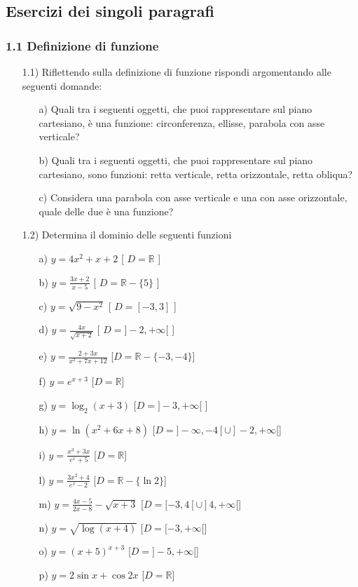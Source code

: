   \subsection{Esercizi dei singoli paragrafi}
  \subsubsection*{1.1 Definizione di funzione}
  \begin{itemize}
  \item[1.1)] Riflettendo sulla definizione di 
funzione rispondi argomentando alle seguenti domande:
  \begin{itemize}
  \item[a)] Quali tra i 
seguenti oggetti, che puoi rappresentare sul piano cartesiano, è una 
funzione: circonferenza, ellisse, parabola con asse verticale?
  \item[b)] Quali tra i 
seguenti oggetti, che puoi rappresentare sul piano cartesiano, sono funzioni: 
retta verticale, retta orizzontale, retta obliqua?
  \item[c)] Considera una 
parabola con asse verticale e una con asse orizzontale, quale delle due è una 
funzione?
  \end{itemize}
  \item[1.2)] Determina il dominio delle 
seguenti funzioni
  \begin{itemize}
  \item[a)] \(y= 4x^2+x+2\)   
   \hfill  [ \(D=\mathbb{R}\) ]
  \item[b)] 
\(y=\frac{3x+2}{x-5}\)   \hfill   
   [ \(D=\mathbb{R}-\{5\}\) ]
  \item[c)] \(y=\sqrt{9-x^2}   \) 
   \hfill   [ \(D=[-3, 3]\) ]
  \item[d)] 
\(y=\frac{4x}{\sqrt{x+2}}  \)  \hfill   
   [ \(D=]-2,+\infty[\) ]
  \item[e)] 
\(y=\frac{2+3x}{x^2+7x+12}\)   \hfill   
[\(D=\mathbb{R}-\{-3,-4\}\)]
  \item[f)] \(y=e^{x+3}\)\hfill   
   [\(D=\mathbb{R}\)]
  \item[g)] \(y=\log_2(x+3)\)  
\hfill  [\(D=]-3, +\infty[\) ]
  \item [h)] \(y=\ln(x^2+6x+8)\)  
  \hfill   
[\(D=]-\infty,-4[\cup]-2,+\infty[\)]
  
\item[i)]\(y=\frac{x^3+3x}{e^x+5}\)\hfill   
  [\(D=\mathbb{R}\)]
  
\item[l)]\(y=\frac{3x^2+4}{e^x-2}\)   \hfill  
   [\(D=\mathbb{R}-\{\ln2\}\)]
  \item[m)] 
\(y=\frac{4x-5}{2x-8}-\sqrt{x+3}\)  \hfill  
[\(D=[-3,4[\cup]4,+\infty[\)]
  \item[n)]\(y=\sqrt{\log(x+4)}\) 
   \hfill  [\(D=[-3,+\infty[\)]
  \item[o)]\(y=(x+5)^{x+3}\)  
   \hfill  [\(D=]-5,+\infty[\)]
  \item[p)] 
\(y=2\sin{x}+\cos{2x}\)   \hfill   
[\(D=\mathbb{R}\)]
  

\end{itemize}
\end{itemize}
